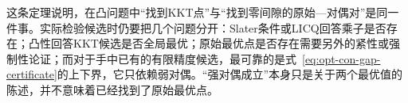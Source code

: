 这条定理说明，在凸问题中“找到KKT点”与“找到零间隙的原始—对偶对”是同一件事。实际检验候选时仍要把几个问题分开：Slater条件或LICQ回答乘子是否存在；凸性回答KKT候选是否全局最优；原始最优点是否存在需要另外的紧性或强制性论证；而对于手中已有的有限精度候选，最可靠的是式~\eqref{eq:opt-con-gap-certificate}的上下界，它只依赖弱对偶。“强对偶成立”本身只是关于两个最优值的陈述，并不意味着已经找到了原始最优点。
